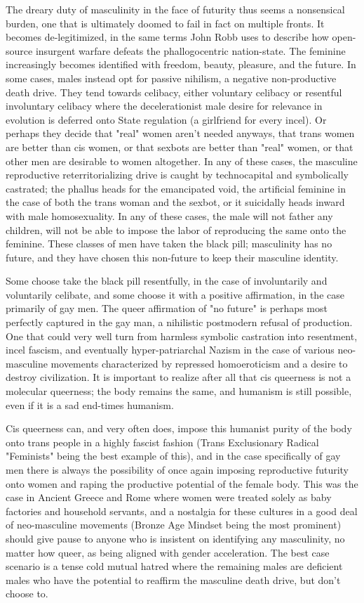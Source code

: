 \documentclass[10pt, statementpaper, twoside, openright]{memoir}
\begin{document}
The dreary duty of masculinity in the face of futurity thus seems a nonsensical burden, one that is ultimately doomed to fail in fact on multiple fronts. It becomes de-legitimized, in the same terms John Robb uses to describe how open-source insurgent warfare defeats the phallogocentric nation-state. The feminine increasingly becomes identified with freedom, beauty, pleasure, and the future. In some cases, males instead opt for passive nihilism, a negative non-productive death drive. They tend towards celibacy, either voluntary celibacy or resentful involuntary celibacy where the decelerationist male desire for relevance in evolution is deferred onto State regulation (a girlfriend for every incel). Or perhaps they decide that "real" women aren't needed anyways, that trans women are better than cis women, or that sexbots are better than "real" women, or that other men are desirable to women altogether. In any of these cases, the masculine reproductive reterritorializing drive is caught by technocapital and symbolically castrated; the phallus heads for the emancipated void, the artificial feminine in the case of both the trans woman and the sexbot, or it suicidally heads inward with male homosexuality. In any of these cases, the male will not father any children, will not be able to impose the labor of reproducing the same onto the feminine. These classes of men have taken the black pill; masculinity has no future, and they have chosen this non-future to keep their masculine identity.

Some choose take the black pill resentfully, in the case of involuntarily and voluntarily celibate, and some choose it with a positive affirmation, in the case primarily of gay men. The queer affirmation of "no future" is perhaps most perfectly captured in the gay man, a nihilistic postmodern refusal of production. One that could very well turn from harmless symbolic castration into resentment, incel fascism, and eventually hyper-patriarchal Nazism in the case of various neo-masculine movements characterized by repressed homoeroticism and a desire to destroy civilization. It is important to realize after all that cis queerness is not a molecular queerness; the body remains the same, and humanism is still possible, even if it is a sad end-times humanism.

Cis queerness can, and very often does, impose this humanist purity of the body onto trans people in a highly fascist fashion (Trans Exclusionary Radical "Feminists" being the best example of this), and in the case specifically of gay men there is always the possibility of once again imposing reproductive futurity onto women and raping the productive potential of the female body. This was the case in Ancient Greece and Rome where women were treated solely as baby factories and household servants, and a nostalgia for these cultures in a good deal of neo-masculine movements (Bronze Age Mindset being the most prominent) should give pause to anyone who is insistent on identifying any masculinity, no matter how queer, as being aligned with gender acceleration. The best case scenario is a tense cold mutual hatred where the remaining males are deficient males who have the potential to reaffirm the masculine death drive, but don't choose to.
\end{document}

